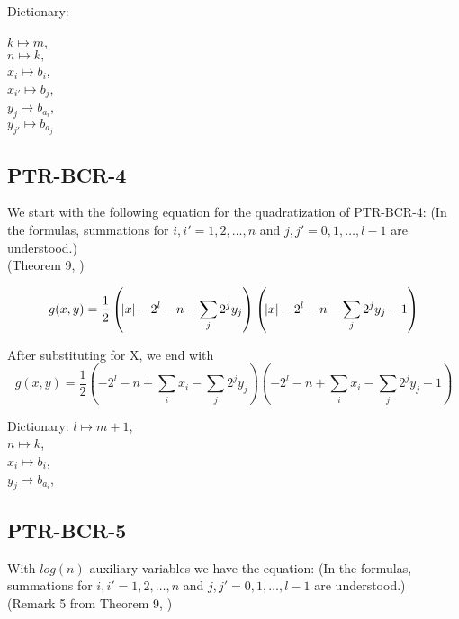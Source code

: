 \documentclass[english,notitlepage,longbibliography,showpacs,preprintnumbers,amsmath,amssymb,aps,prx,nofootinbib,12pt,superscriptaddress]{revtex4-1}
\begin{document}
\noindent Dictionary:

\noindent $k\mapsto m$,\\
$n\mapsto k,$\\
$x_i\mapsto b_i$,\\
$x_{i'}\mapsto b_j$,\\
$y_j\mapsto b_{a_i}$,\\
$y_{j'}\mapsto b_{a_j}$\\




\subsection{PTR-BCR-4} %

We start with the following equation for the quadratization of PTR-BCR-4: (In the formulas, summations for $i,i' = 1,2,\dots,n$ and $j,j' = 0,1,\dots,l-1$ are understood.)
\\(Theorem 9, \cite{Boros2018boundsPaper})

\begin{equation}
g(x,y) = \frac{1}{2}\left(\abs{x} - 2^l - n - \sum_j 2^j y_j\right)\left(\abs{x} - 2^l - n - \sum_j 2^j y_j - 1\right)
\end{equation}

\noindent After substituting for X, we end with
\begin{equation}
g(x,y) = \frac{1}{2}\left(-2^l - n + \sum_i x_i - \sum_j 2^j y_j\right)\left(-2^l - n + \sum_i x_i - \sum_j 2^j y_j - 1\right)
\end{equation}

\noindent Dictionary:
\noindent $l\mapsto m + 1$,\\
$n\mapsto k$,\\
$x_i\mapsto b_i$,\\
$y_j\mapsto b_{a_i}$,\\



\subsection{PTR-BCR-5} %
With $log(n)$ auxiliary variables we have the equation:
(In the formulas, summations for $i,i' = 1,2,\dots,n$ and $j,j' = 0,1,\dots,l-1$ are understood.)
\\(Remark 5 from Theorem 9, \cite{Boros2018boundsPaper})
\end{document}
